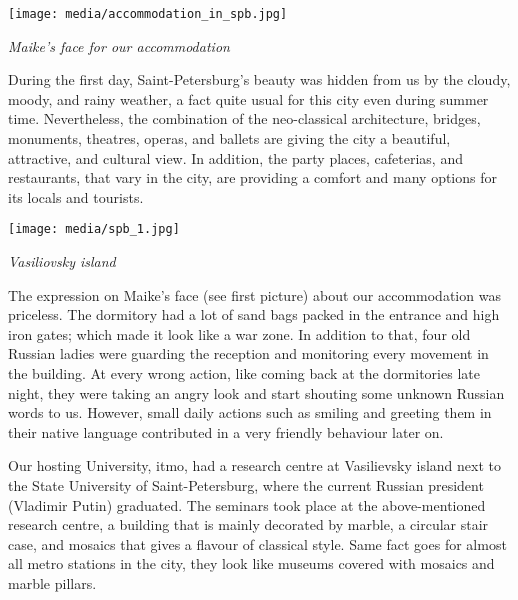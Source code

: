 \documentclass[10pt,a4paper]{article} %
\begin{document}
\begin{multicols}{3}
\begin{center}
	\texttt{[image: media/accommodation\_in\_spb.jpg]}
	\par\textit{Maike's face for our accommodation}
\end{center}


During the first day, Saint-Petersburg's beauty was hidden from us by the cloudy, 
moody, and rainy weather, a fact quite usual for this city even during summer time.  
Nevertheless, the combination of the neo-classical architecture, bridges, monuments, 
theatres, operas, and ballets are giving the city a beautiful, attractive, 
and cultural view. 
In addition, the party places, cafeterias, and restaurants, that vary in the 
city, are providing a comfort and many options for its locals and tourists. 


\begin{center}
	\texttt{[image: media/spb\_1.jpg]}
	\par\textit{Vasiliovsky island}
\end{center}

The expression on Maike's face (see first picture) about our accommodation was 
priceless. 
The dormitory had a lot of sand bags packed in the entrance and high iron gates; 
which made it look like a war zone.  
In addition to that, four old Russian ladies were guarding the reception and 
monitoring every movement in the building. 
At every wrong action, like coming back at the dormitories late night, they 
were taking an angry look and start shouting some unknown Russian words to us. 
However, small daily actions such as smiling and greeting them in their native 
language contributed in a very friendly behaviour later on.


Our hosting University, {\sc itmo}, had a research centre at Vasilievsky island 
next to the State University of Saint-Petersburg, where the current Russian 
president (Vladimir Putin) graduated. 
The seminars took place at the above-mentioned research centre, a building that 
is mainly decorated by marble, a circular stair case, 
and mosaics that gives a flavour of classical style. 
Same fact goes for almost all metro stations in the city, they look like 
museums covered with mosaics and marble pillars. 


\end{multicols}
\end{document}
